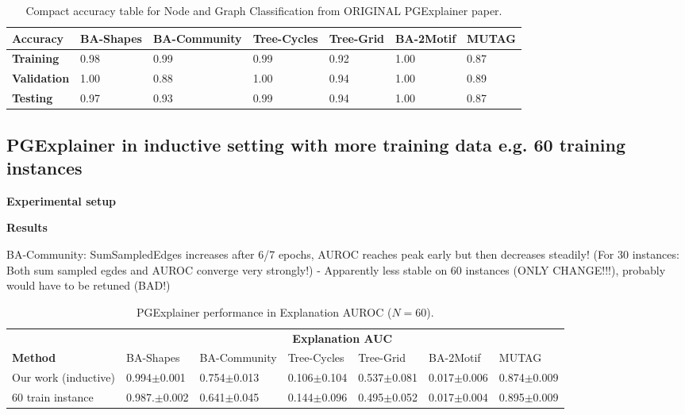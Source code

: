 \begin{table}[h]
    \centering
    \scriptsize
    \begin{tabularx}{\linewidth}{l|X X X X|X X}
    \hline
    \textbf{Accuracy} & \textbf{BA-Shapes} & \textbf{BA-Community} & \textbf{Tree-Cycles} & \textbf{Tree-Grid} & \textbf{BA-2Motif} & \textbf{MUTAG} \\
    \hline
    \textbf{Training}   & 0.98 & 0.99 & 0.99 & 0.92 & 1.00 & 0.87 \\
    \textbf{Validation} & 1.00 & 0.88 & 1.00 & 0.94 & 1.00 & 0.89 \\
    \textbf{Testing}    & 0.97 & 0.93 & 0.99 & 0.94 & 1.00 & 0.87 \\
    \hline
    \end{tabularx}
    \caption[Accuracies of original GNN downstream task]{Compact accuracy table for Node and Graph Classification from ORIGINAL PGExplainer paper.}
    \label{tab:compact-accuracy}
\end{table}


\subsection{PGExplainer in inductive setting with more training data e.g. 60 training instances}

\textbf{Experimental setup}

\textbf{Results}


BA-Community: SumSampledEdges increases after 6/7 epochs, AUROC reaches peak early but then decreases steadily! (For 30 instances: Both sum sampled egdes and AUROC converge very strongly!) - Apparently less stable on 60 instances (ONLY CHANGE!!!), probably would have to be retuned (BAD!)
\begin{table}[ht]
    \centering
    \scriptsize
    \begin{tabularx}{\textwidth}{l*{6}{X}}   %
    \toprule
    \textbf{} & \multicolumn{6}{c}{\textbf{Explanation AUC}} \\
    \cmidrule{2-7}
    \textbf{Method} & BA-Shapes & BA-Community & Tree-Cycles & Tree-Grid & BA-2Motif & MUTAG \\
    \midrule
    Our work (inductive) & 0.994$\pm$0.001 & 0.754$\pm$0.013 & 0.106$\pm$0.104 & 0.537$\pm$0.081 & 0.017$\pm$0.006 & 0.874$\pm$0.009 \\
    \midrule
    60 train instance & 0.987.$\pm$0.002 & 0.641$\pm$0.045 & 0.144$\pm$0.096 & 0.495$\pm$0.052 & 0.017$\pm$0.004 & 0.895$\pm$0.009 \\
    \bottomrule
    \end{tabularx}
    \caption[Inductive performance with 60 training instances]{PGExplainer performance in Explanation AUROC ($N=60$).}
    \label{tab:pgexplainer_auc}
\end{table}



